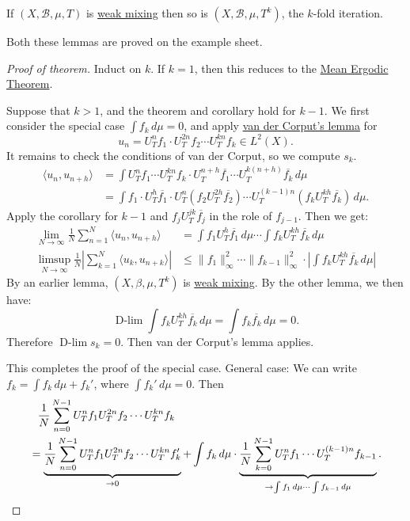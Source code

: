 \documentclass{article}
\DeclareMathOperator*{\dlim}{D-lim}
\begin{document}
\begin{lemma}
  If $(X, \mathcal{B}, \mu, T)$ is \hyperlink{def:wMixing}{weak mixing} then so is $(X, \mathcal{B}, \mu, T^k)$, the $k$-fold iteration.
\end{lemma}
Both these lemmas are proved on the example sheet.
\begin{proof}[Proof of theorem]
  Induct on $k$.
  If $k=1$, then this reduces to the \hyperlink{thm:meanet}{Mean Ergodic Theorem}.

  Suppose that $k > 1$, and the theorem and corollary hold for $k-1$.
  We first consider the special case $\int f_k \, d\mu = 0$, and apply \hyperlink{lem:vdC}{van der Corput's lemma} for
  \begin{equation*}
    u_n = U_T^n f_1 \cdot U_T^{2n} f_2 \dotsm U_T^{kn} f_k \in L^2(X).
  \end{equation*}
  It remains to check the conditions of van der Corput, so we compute $s_k$.
  \begin{align*}
    \langle u_n, u_{n+h} \rangle &= \int U_T^n f_1 \dotsm U_T^{kn} f_k \cdot U_T^{n+h} \overline{f_1} \dotsm U_T^{k(n+h)} \overline{f_k} \, d\mu \\
                                 &= \int f_1 \cdot U_T^h \overline{f_1} \cdot U_T^n(f_2 U_T^{2h} \overline{f_2}) \dotsm U_T^{(k-1) n} (f_k U_T^{kh} \overline{f_k}) \, d\mu.
  \end{align*}
  Apply the corollary for $k-1$ and $f_j U_T^{jk} \overline{f_j}$ in the role of $f_{j-1}$.
  Then we get:
  \begin{align*}
    \lim_{N \to \infty} \frac{1}{N} \sum_{n=1}^N \langle u_n, u_{n+h} \rangle &= \int f_1 U_T^h \overline{f_1} \, d\mu \dotsm \int f_k U_T^{kh} \overline{f_k} \, d\mu \\
    \limsup_{N \to \infty} \frac{1}{N} \left|\sum_{k=1}^N \langle u_k, u_{n+k} \rangle \right| &\leq \|f_1\|^2_\infty \dotsm \|f_{k-1}\|^2_\infty \cdot \left|\int f_k U_T^{kh} \overline{f_k} \, d\mu\right|
  \end{align*}
  By an earlier lemma, $(X, \beta, \mu, T^k)$ is \hyperlink{def:wMixing}{weak mixing}.
  By the other lemma, we then have:
  \begin{equation*}
    \dlim \int f_k U_T^{kh} \overline{f_k} \, d\mu = \int f_k \overline{f_k} \,d\mu = 0.
  \end{equation*}
  Therefore $\dlim s_k = 0$.
  Then van der Corput's lemma applies.

  This completes the proof of the special case.
  General case: We can write $f_k = \int f_k \, d\mu + f_k'$, where $\int f_k' \, d\mu = 0$.
  Then
  \begin{align*}
    &\phantom{=}\frac{1}{N} \sum_{n=0}^{N-1} U_T^n f_1 U_T^{2n} f_2 \dotsm U_T^{kn} f_k  \\
    &= \underbrace{\frac{1}{N} \sum_{n=0}^{N-1} U_T^n f_1 U_T^{2n} f_2 \dotsm U_T^{kn} f_k'}_{\to 0} + \int f_k \, d\mu \cdot \underbrace{\frac{1}{N} \sum_{k=0}^{N-1} U_T^n f_1 \dotsm U_T^{(k-1)n} f_{k-1}}_{\to \int f_1 \, d\mu \dotsm \int f_{k-1} \, d\mu}. \qedhere
  \end{align*}
\end{proof}
\end{document}

